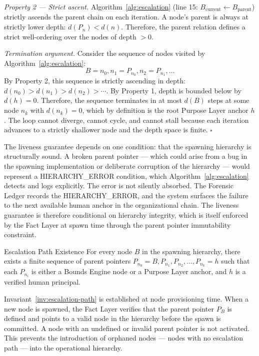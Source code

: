 \medskip

\noindent\textit{Property 2 — Strict ascent.} Algorithm~\ref{alg:escalation} (line 15: $B_{\text{current}} \leftarrow B_{\text{parent}}$) strictly ascends the parent chain on each iteration. A node's parent is always at strictly lower depth: $d(P_n) < d(n)$. Therefore, the parent relation defines a strict well-ordering over the nodes of depth $> 0$.

\medskip

\noindent\textit{Termination argument.} Consider the sequence of nodes visited by Algorithm~\ref{alg:escalation}:
\[ B = n_0, n_1 = P_{n_0}, n_2 = P_{n_1}, \ldots \]
By Property 2, this sequence is strictly ascending in depth: $d(n_0) > d(n_1) > d(n_2) > \cdots$. By Property 1, depth is bounded below by $d(h) = 0$. Therefore, the sequence terminates in at most $d(B)$ steps at some node $n_k$ with $d(n_k) = 0$, which by definition is the root Purpose Layer anchor $h$. The loop cannot diverge, cannot cycle, and cannot stall because each iteration advances to a strictly shallower node and the depth space is finite. $\square$

\medskip

The liveness guarantee depends on one condition: that the spawning hierarchy is structurally sound. A broken parent pointer — which could arise from a bug in the spawning implementation or deliberate corruption of the hierarchy — would represent a HIERARCHY\_ERROR condition, which Algorithm~\ref{alg:escalation} detects and logs explicitly. The error is not silently absorbed. The Forensic Ledger records the HIERARCHY\_ERROR, and the system surfaces the failure to the next available human anchor in the organizational chain. The liveness guarantee is therefore conditional on hierarchy integrity, which is itself enforced by the Fact Layer at spawn time through the parent pointer immutability constraint.

\begin{invariant}{Escalation Path Existence}
\label{inv:escalation-path}
For every node $B$ in the spawning hierarchy, there exists a finite sequence of parent pointers $P_{n_0} = B, P_{n_1}, P_{n_2}, \ldots, P_{n_k} = h$ such that each $P_{n_i}$ is either a Bounds Engine node or a Purpose Layer anchor, and $h$ is a verified human principal.
\end{invariant}

Invariant~\ref{inv:escalation-path} is established at node provisioning time. When a new node is spawned, the Fact Layer verifies that the parent pointer $P_B$ is defined and points to a valid node in the hierarchy before the spawn is committed. A node with an undefined or invalid parent pointer is not activated. This prevents the introduction of orphaned nodes — nodes with no escalation path — into the operational hierarchy.

